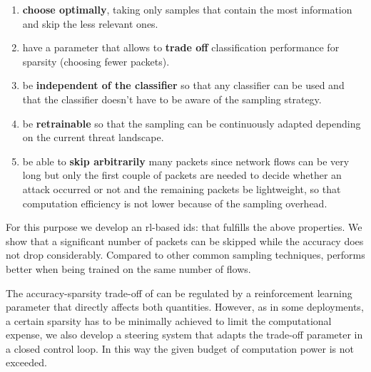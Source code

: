 \documentclass[conference]{IEEEtran}
\begin{document}
\begin{enumerate}
\item \textbf{choose optimally}, taking only samples that contain the most information and skip the less relevant ones.
\item have a parameter that allows to \textbf{trade off} classification performance for sparsity (choosing fewer packets).
\item be \textbf{independent of the classifier} so that any classifier can be used and that the classifier doesn't have to be aware of the sampling strategy.
\item be \textbf{retrainable} so that the sampling can be continuously adapted depending on the current threat landscape.
\item be able to \textbf{skip arbitrarily} many packets since network flows can be very long but only the first couple of packets are needed to decide whether an attack occurred or not and the remaining packets be lightweight, so that computation efficiency is not lower because of the sampling overhead. 
\end{enumerate}



For this purpose we develop an \gls{rl}-based \gls{ids}: \textit{\ours{}} that fulfills the above properties. We show that a significant number of packets can be skipped while the accuracy does not drop
considerably. Compared to other common sampling techniques, \ours{} performs better when being trained on the same number of flows.


The accuracy-sparsity trade-off of \ours{} can be regulated by a reinforcement learning parameter that directly affects both quantities. However, as in some deployments, a certain sparsity has to be minimally achieved to limit the computational expense, we also develop a steering system that adapts the trade-off parameter in a closed control loop. In this way the given budget of computation power is not exceeded.
\end{document}
